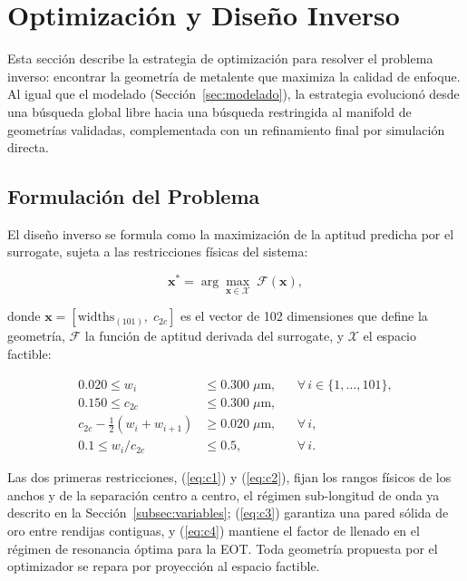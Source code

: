 \section{Optimización y Diseño Inverso}\label{sec:optimizacion}

Esta sección describe la estrategia de optimización para resolver el problema inverso: encontrar la geometría de metalente que maximiza la calidad de enfoque. Al igual que el modelado (Sección~\ref{sec:modelado}), la estrategia evolucionó desde una búsqueda global libre hacia una búsqueda restringida al manifold de geometrías validadas, complementada con un refinamiento final por simulación directa.

\subsection{Formulación del Problema}\label{subsec:formulacion}

El diseño inverso se formula como la maximización de la aptitud predicha por el surrogate, sujeta a las restricciones físicas del sistema:

\begin{equation}
    \mathbf{x}^* = \arg\max_{\mathbf{x} \in \mathcal{X}} \; \mathcal{F}(\mathbf{x}),
    \label{eq:optimization}
\end{equation}

\noindent donde $\mathbf{x} = [\text{widths}_{(101)},\; c_{2c}]$ es el vector de 102 dimensiones que define la geometría, $\mathcal{F}$ la función de aptitud derivada del surrogate, y $\mathcal{X}$ el espacio factible:

\begin{align}
    0.020 \leq w_i &\leq 0.300 \;\mu\text{m}, & &\forall\, i \in \{1,\ldots,101\}, \label{eq:c1} \\
    0.150 \leq c_{2c} &\leq 0.300 \;\mu\text{m}, & & \label{eq:c2} \\
    c_{2c} - \tfrac{1}{2}(w_i + w_{i+1}) &\geq 0.020 \;\mu\text{m}, & &\forall\, i, \label{eq:c3} \\
    0.1 \leq w_i / c_{2c} &\leq 0.5, & &\forall\, i. \label{eq:c4}
\end{align}

Las dos primeras restricciones, (\ref{eq:c1}) y (\ref{eq:c2}), fijan los rangos físicos de los anchos y de la separación centro a centro, el régimen sub-longitud de onda ya descrito en la Sección~\ref{subsec:variables}; (\ref{eq:c3}) garantiza una pared sólida de oro entre rendijas contiguas, y (\ref{eq:c4}) mantiene el factor de llenado en el régimen de resonancia óptima para la EOT. Toda geometría propuesta por el optimizador se repara por proyección al espacio factible.

